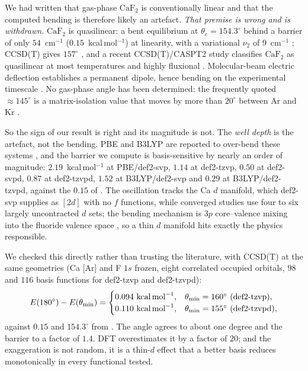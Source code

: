 We had written that gas-phase $\mathrm{CaF_2}$ is conventionally linear and that
the computed bending is therefore likely an artefact. \emph{That premise is wrong
and is withdrawn.} $\mathrm{CaF_2}$ is quasilinear: a bent equilibrium at
$\theta_e = 154.3^\circ$ behind a barrier of only $54$~cm$^{-1}$
($0.15$~kcal\,mol$^{-1}$) at linearity, with a variational $\nu_2$ of
$9$~cm$^{-1}$ \citep{Koput2004}; CCSD(T) gives $157^\circ$ \citep{Vasiliu2010}, and
a recent CCSD(T)/CASPT2 study classifies $\mathrm{CaF_2}$ as quasilinear at most
temperatures and highly fluxional \citep{Romeu2025}. Molecular-beam electric
deflection establishes a permanent dipole, hence bending on the experimental
timescale \citep{Wharton1963}. No gas-phase angle has been determined: the
frequently quoted $\approx145^\circ$ is a matrix-isolation value that moves by more
than $20^\circ$ between Ar and Kr \citep{Calder1969}.

So the sign of our result is right and its magnitude is not. The \emph{well depth}
is the artefact, not the bending. PBE and B3LYP are reported to over-bend these
systems \citep{Donald2006}, and the barrier we compute is basis-sensitive by nearly
an order of magnitude: $2.19$~kcal\,mol$^{-1}$ at PBE/def2-svp, $1.14$ at
def2-tzvp, $0.50$ at def2-svpd, $0.87$ at def2-tzvpd, $1.52$ at B3LYP/def2-svp and
$0.29$ at B3LYP/def2-tzvpd, against the $0.15$ of \citet{Koput2004}. The
oscillation tracks the Ca $d$ manifold, which def2-svp supplies as $[2d]$ with no
$f$ functions, while converged studies use four to six largely uncontracted $d$
sets; the bending mechanism is $3p$ core--valence mixing into the fluoride
valence space \citep{Romeu2025}, so a thin $d$ manifold hits exactly the physics
responsible.

We checked this directly rather than trusting the literature, with CCSD(T) at the
same geometries (Ca [Ar] and F $1s$ frozen, eight correlated occupied orbitals,
$98$ and $116$ basis functions for def2-tzvp and def2-tzvpd):
\[
  E(180^\circ)-E(\theta_{\min}) =
  \begin{cases}
    0.094\ \text{kcal\,mol}^{-1}, & \theta_{\min}=160^\circ \ (\text{def2-tzvp}),\\
    0.110\ \text{kcal\,mol}^{-1}, & \theta_{\min}=155^\circ \ (\text{def2-tzvpd}),
  \end{cases}
\]
against $0.15$ and $154.3^\circ$ from \citet{Koput2004}. The angle agrees to about
one degree and the barrier to a factor of $1.4$. DFT overestimates it by a factor of
$20$; and the exaggeration is not random, it is a thin-$d$ effect that a better
basis reduces monotonically in every functional tested.

